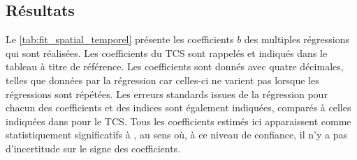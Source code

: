 \documentclass[../main.tex]{subfiles}
\begin{document}
\subsection{Résultats}\label{sec:apport_resultat}

Le \cref{tab:fit_spatial_temporel} présente les coefficients $b$ des multiples régressions qui sont réalisées. Les coefficients du TCS sont rappelés et indiqués
dans le tableau à titre de référence. Les coefficients sont donnés avec quatre décimales, telles que données par la régression car celles-ci ne varient pas
lorsque les régressions sont répétées. Les erreurs standards issues de la régression pour chacun des coefficients et des indices sont également indiquées,
comparés à celles indiquées dans \textcite{tippett_poisson_2011} pour le TCS. Tous les coefficients estimés ici apparaissent comme statistiquement significatifs
à , au sens où, à ce niveau de confiance, il n'y a pas d'incertitude sur le signe des coefficients.
\end{document}
